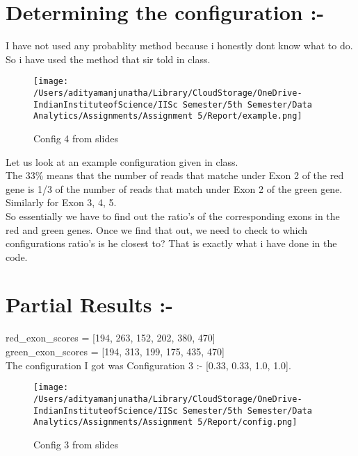 \documentclass{article}
\begin{document}
\section{Determining the configuration :-}
I have not used any probablity method because i honestly dont know what to do. So i have used the method that sir told in class.
\begin{figure}[h]
    \centering
    \texttt{[image: /Users/adityamanjunatha/Library/CloudStorage/OneDrive-IndianInstituteofScience/IISc Semester/5th Semester/Data Analytics/Assignments/Assignment 5/Report/example.png]} %
    \caption{Config 4 from slides}
    \label{fig:sample-image}
\end{figure}
Let us look at an example configuration given in class. \\
The 33\% means that the number of reads that matche under Exon 2 of the red gene is 1/3 of the number of reads that match under Exon 2 of the green gene. \\
Similarly for Exon 3, 4, 5. \\
So essentially we have to find out the ratio's of the corresponding exons in the red and green genes. Once we find that out, we need to check to which configurations ratio's is he closest to?
That is exactly what i have done in the code. \\
\section{Partial Results :-}
red\_exon\_scores = [194, 263, 152, 202, 380, 470]\\
green\_exon\_scores = [194, 313, 199, 175, 435, 470]\\
The configuration I got was Configuration 3 :- [0.33, 0.33, 1.0, 1.0]. 
\begin{figure}[h]
    \centering
    \texttt{[image: /Users/adityamanjunatha/Library/CloudStorage/OneDrive-IndianInstituteofScience/IISc Semester/5th Semester/Data Analytics/Assignments/Assignment 5/Report/config.png]} %
    \caption{Config 3 from slides}
    \label{sample-image}
\end{figure}
\end{document}
